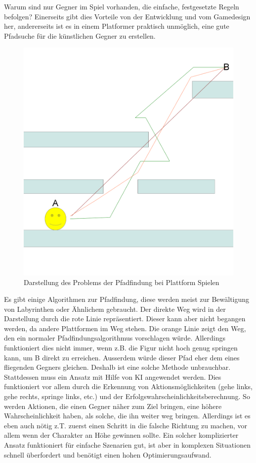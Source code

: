 \documentclass[12pt,a4paper,titlepage]{article}
\begin{document}
			Warum sind nur Gegner im Spiel vorhanden, die einfache, festgesetzte Regeln befolgen? Einerseits gibt dies Vorteile von der Entwicklung und vom Gamedesign her, andererseits ist es in einem Platformer praktisch unmöglich, eine gute Pfadsuche für die künstlichen Gegner zu erstellen.
			\begin{figure}[H]
  				\centering
				\includegraphics[keepaspectratio=true,scale=0.3]{ai.png}
  				\caption{Darstellung des Problems der Pfadfindung bei Plattform Spielen}
			\end{figure}
			Es gibt einige Algorithmen zur Pfadfindung, diese werden meist zur Bewältigung von Labyrinthen oder Ähnlichem gebraucht. Der direkte Weg wird in der Darstellung durch die rote Linie repräsentiert. Dieser kann aber nicht begangen werden, da andere Plattformen im Weg stehen. Die orange Linie zeigt den Weg, den ein normaler Pfadfindungsalgorithmus vorschlagen würde. Allerdings funktioniert dies nicht immer, wenn z.B. die Figur nicht hoch genug springen kann, um B direkt zu erreichen. Ausserdem würde dieser Pfad eher dem eines fliegenden Gegners gleichen. Deshalb ist eine solche Methode unbrauchbar.\\
			
			Stattdessen muss ein Ansatz mit Hilfe von KI angewendet werden. Dies funktioniert vor allem durch die Erkennung von Aktionsmöglichkeiten (gehe links, gehe rechts, springe links, etc.) und der Erfolgswahrscheinlichkeitsberechnung. So werden Aktionen, die einen Gegner näher zum Ziel bringen, eine höhere Wahrscheinlichkeit haben, als solche, die ihn weiter weg bringen. Allerdings ist es eben auch nötig z.T. zuerst einen Schritt in die falsche Richtung zu machen, vor allem wenn der Charakter an Höhe gewinnen sollte. Ein solcher komplizierter Ansatz funktioniert für einfache Szenarien gut, ist aber in komplexen Situationen schnell überfordert und benötigt einen hohen Optimierungsaufwand.
			
\end{document}
